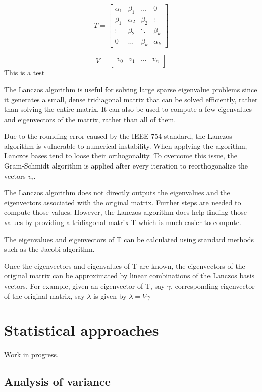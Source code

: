 \documentclass{book}
\begin{document}
$$
T=
\begin{bmatrix}
  \alpha_{1} & \beta_{1} & \ldots & 0\\
  \beta_{1} & \alpha_{2} & \beta_{2} & \vdots \\
  \vdots & \beta_{2} &  \ddots & \beta_{k} \\
  0 & \ldots & \beta_{k} & \alpha_{k}
\end{bmatrix}
$$

$$
V=
\begin{bmatrix}
  v_{0} & v_{1} & \ldots & v_{n} \\
\end{bmatrix}
$$
This is a test

The Lanczos algorithm is useful for solving large sparse eigenvalue problems since it generates a small, dense tridiagonal matrix that can be solved efficiently, rather than solving the entire matrix. It can also be used to compute a few eigenvalues and eigenvectors of the matrix, rather than all of them.

Due to the rounding error caused by the IEEE-754 standard, the Lanczos algorithm is vulnerable to numerical instability. When applying the algorithm, Lanczos bases tend to loose their orthogonality. To overcome this issue, the Gram-Schmidt algorithm is applied after every iteration to reorthogonalize the vectors $v_{i}$.

The Lanczos algorithm does not directly outputs the eigenvalues and the eigenvectors associated with the original matrix. Further steps are needed to compute those values. However, the Lanczos algorithm does help finding those values by providing a tridiagonal matrix T which is much easier to compute. 

  The eigenvalues and eigenvectors of T can be calculated using standard methods such as the Jacobi algorithm. 

  Once the eigenvectors and eigenvalues of T are known, the eigenvectors of the original matrix can be approximated by linear combinations of the Lanczos basis vectors. For example, given an eigenvector of T, say $\gamma$, corresponding eigenvector of the original matrix, say $\lambda$ is given by $\lambda = V\gamma$ 
  
\section{Statistical approaches}

Work in progress.
\subsection{Analysis of variance}
\end{document}

